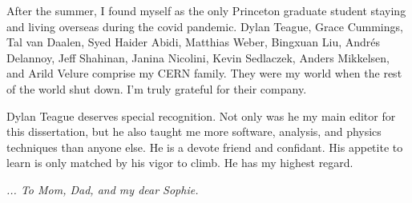 After the summer, I found myself as the only Princeton graduate student staying and living overseas during the covid pandemic. Dylan Teague,  Grace Cummings, Tal van Daalen, Syed Haider Abidi,  Matthias Weber, Bingxuan Liu, Andrés Delannoy, Jeff Shahinan, Janina Nicolini, Kevin Sedlaczek, Anders Mikkelsen, and Arild Velure comprise my CERN family. They were my world when the rest of the world shut down. I'm truly grateful for their company. 

Dylan Teague deserves special recognition. Not only was he my main editor for this dissertation, but he also taught me more software, analysis, and physics techniques than anyone else. He is a devote friend and confidant. His appetite to learn is only matched by his vigor to climb. He has my highest regard. 
\newline
\newline
\newline
\newline
\newline

\textit{... To Mom, Dad, and my dear Sophie.}  

